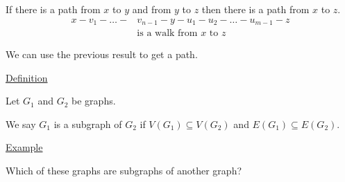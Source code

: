 \documentclass{article}
\begin{document}
If there is a path from $x$ to $y$ and from $y$ to $z$ then there is a path from $x$ to $z$. 
\begin{align*}
    x-v_1-\ldots-&v_{n-1}-y-u_1-u_2-\ldots-u_{m-1}-z \\
    &\text{is a walk from } x \text{ to } z
\end{align*}

We can use the previous result to get a path. 

\underline{Definition}

Let $G_1$ and $G_2$ be graphs. 

We say $G_1$ is a subgraph of $G_2$ if $V(G_1) \subseteq V(G_2)$ and $E(G_1) \subseteq E(G_2)$.

\underline{Example}

Which of these graphs are subgraphs of another graph?
\end{document}
